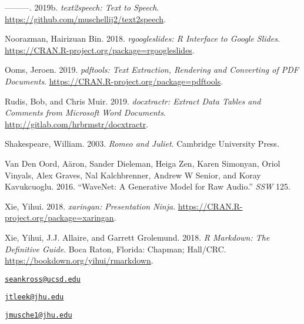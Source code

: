 \leavevmode\hypertarget{ref-text2speech}{}%
---------. 2019b. \emph{text2speech: Text to Speech}.
\url{https://github.com/muschellij2/text2speech}.

\leavevmode\hypertarget{ref-rgoogleslides}{}%
Noorazman, Hairizuan Bin. 2018. \emph{rgoogleslides: R Interface to
Google Slides}. \url{https://CRAN.R-project.org/package=rgoogleslides}.

\leavevmode\hypertarget{ref-pdftools}{}%
Ooms, Jeroen. 2019. \emph{pdftools: Text Extraction, Rendering and
Converting of PDF Documents}.
\url{https://CRAN.R-project.org/package=pdftools}.

\leavevmode\hypertarget{ref-docxtractr}{}%
Rudis, Bob, and Chris Muir. 2019. \emph{docxtractr: Extract Data Tables
and Comments from Microsoft Word Documents}.
\url{http://gitlab.com/hrbrmstr/docxtractr}.

\leavevmode\hypertarget{ref-shakespeare2003romeo}{}%
Shakespeare, William. 2003. \emph{Romeo and Juliet}. Cambridge
University Press.

\leavevmode\hypertarget{ref-van2016wavenet}{}%
Van Den Oord, Aäron, Sander Dieleman, Heiga Zen, Karen Simonyan, Oriol
Vinyals, Alex Graves, Nal Kalchbrenner, Andrew W Senior, and Koray
Kavukcuoglu. 2016. ``WaveNet: A Generative Model for Raw Audio.''
\emph{SSW} 125.

\leavevmode\hypertarget{ref-xaringan}{}%
Xie, Yihui. 2018. \emph{xaringan: Presentation Ninja}.
\url{https://CRAN.R-project.org/package=xaringan}.

\leavevmode\hypertarget{ref-rmarkdownbook}{}%
Xie, Yihui, J.J. Allaire, and Garrett Grolemund. 2018. \emph{R Markdown:
The Definitive Guide}. Boca Raton, Florida: Chapman; Hall/CRC.
\url{https://bookdown.org/yihui/rmarkdown}.



\address{%
Sean Kross\\
Cognitive Science, University of California, San Diego\\
9500 Gilman Dr.\\ La Jolla, CA 92093\\
}
\href{mailto:seankross@ucsd.edu}{\nolinkurl{seankross@ucsd.edu}}

\address{%
Jeffrey T. Leek\\
Department of Biostatistics, Johns Hopkins Bloomberg School of Public
Health\\
615 N Wolfe Street\\ Baltimore, MD 21231\\
}
\href{mailto:jtleek@jhu.edu}{\nolinkurl{jtleek@jhu.edu}}

\address{%
John Muschelli\\
Department of Biostatistics, Johns Hopkins Bloomberg School of Public
Health\\
615 N Wolfe Street\\ Baltimore, MD 21231\\
}
\href{mailto:jmusche1@jhu.edu}{\nolinkurl{jmusche1@jhu.edu}}

